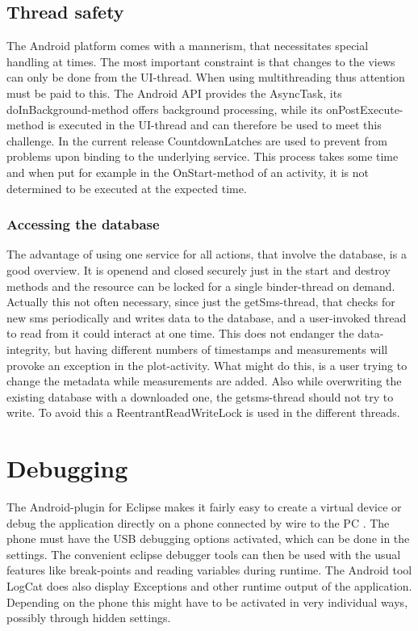 \documentclass[11pt,oneside,a4paper]{scrartcl}
\begin{document}
\subsection{Thread safety}
The Android platform comes with a mannerism, that necessitates special handling at times. The most important constraint is that changes to the views can only be done from the UI-thread. When using multithreading thus attention must be paid to this. The Android API provides the AsyncTask, its doInBackground-method offers background processing, while its onPostExecute-method is executed in the UI-thread and can therefore be used to meet this challenge.
In the current release CountdownLatches are used to prevent from problems upon binding to the underlying service. This process takes some time and when put for example in the OnStart-method of an activity, it is not determined to be executed at the expected time.

\subsubsection{Accessing the database}\label{sec:database_safety}
The advantage of using one service for all actions, that involve the database, is a good overview. It is openend and closed securely just in the start and destroy methods and the resource can be locked for a single binder-thread on demand. Actually this not often necessary, since just the getSms-thread, that checks for new sms periodically and writes data to the database, and a user-invoked thread to read from it could interact at one time. This does not endanger the data-integrity, but having different numbers of timestamps and measurements will provoke an exception in the plot-activity.
What might do this, is a user trying to change the metadata while measurements are added. 
Also while overwriting the existing database with a downloaded one, the getsms-thread should not try to write. To avoid this a ReentrantReadWriteLock is used in the different threads.

\section{Debugging}\label{sec:Debugging}
The Android-plugin for Eclipse makes it fairly easy to create a virtual device or debug the application directly on a phone connected by wire to the PC . The phone must have the USB debugging options activated, which can be done in the settings. The convenient eclipse debugger tools can then be used with the usual features like break-points and reading variables during runtime. The Android tool LogCat does also display Exceptions and other runtime output of the application. Depending on the phone this might have to be activated in very individual ways, possibly through hidden settings.
\end{document}

